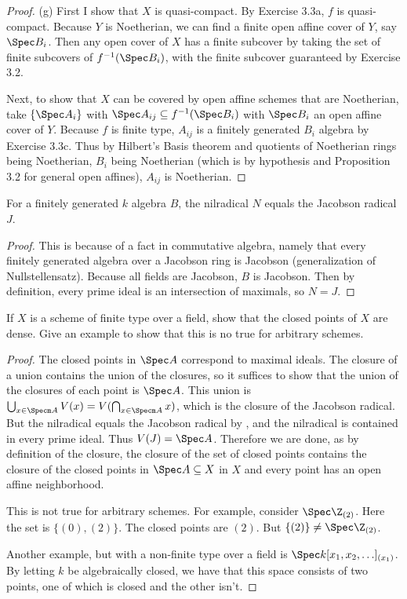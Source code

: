 \begin{proof}
	(g) First I show that $X $ is quasi-compact.
	By Exercise 3.3a, $f $ is quasi-compact.
	Because $Y $ is Noetherian, we can find a finite open affine cover of $Y $, say $\Spec B_i $.
	Then any open cover of $X $ has a finite subcover by taking the set of finite subcovers of $f^{-1}(\Spec B_i) $, with the finite subcover guaranteed by Exercise 3.2.

	Next, to show that $X $ can be covered by open affine schemes that are Noetherian, take $\{\Spec A_i\}   $ with $\Spec A_{ij} \subseteq f^{-1}(\Spec B_i) $ with $\Spec B_i $ an open affine cover of $Y $.
	Because $f $ is finite type, $A_{ij} $ is a finitely generated $B_i $ algebra by Exercise 3.3c.
	Thus by Hilbert's Basis theorem and quotients of Noetherian rings being Noetherian, $B_i $ being Noetherian (which is by hypothesis and Proposition 3.2 for general open affines), $A_{ij} $ is Noetherian.
\end{proof}

\begin{lem}\label{lem:finitetypenilradical}
	For a finitely generated $k $ algebra $B $, the nilradical $N $ equals the Jacobson radical $J $.
\end{lem}
\begin{proof}
	This is because of a fact in commutative algebra, namely that every finitely generated algebra over a Jacobson ring is Jacobson (generalization of Nullstellensatz).
	Because all fields are Jacobson, $B $ is Jacobson.
	Then by definition, every prime ideal is an intersection of maximals, so $N = J $.
\end{proof}

\begin{exercise}
	If $X $ is a scheme of finite type over a field, show that the closed points of $X $ are dense. Give an example to show that this is no true for arbitrary schemes.
\end{exercise}
\begin{proof}
	The closed points in $\Spec A $ correspond to maximal ideals.
	The closure of a union contains the union of the closures, so it suffices to show that the union of the closures of each point is $\Spec A $.
	This union is $\bigcup_{x\in \Specm A} V(x) = V(\bigcap_{x\in \Specm A} x)$, which is the closure of the Jacobson radical.
	But the nilradical equals the Jacobson radical by , and the nilradical is contained in every prime ideal.
	Thus $V(J) = \Spec A $.
	Therefore we are done, as by definition of the closure, the closure of the set of closed points contains the closure of the closed points in $\Spec A \subseteq X $ in $X $ and every point has an open affine neighborhood.

	This is not true for arbitrary schemes.
	For example, consider $\Spec \Z_{(2)} $.
	Here the set is $\{(0),(2)\}   $.
	The closed points are $(2) $.%
	But $\{(2)\}  \ne \Spec \Z_{(2)}$.

	Another example, but with a non-finite type over a field is $\Spec k[x_{1},x_{2},\ldots] _{(x_{1})}$.
	By letting $k $ be algebraically closed, we have that this space consists of two points, one of which is closed and the other isn't.
\end{proof}


